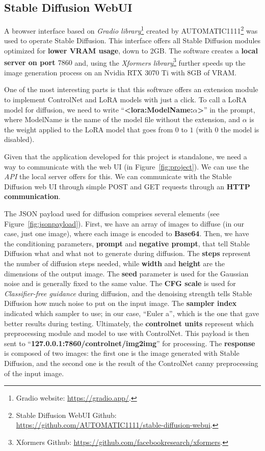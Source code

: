 \documentclass[sn-mathphys,Numbered]{sn-jnl}
\theoremstyle{thmstyleone}%
\theoremstyle{thmstyletwo}%
\theoremstyle{thmstylethree}%
\begin{document}
\subsection{Stable Diffusion WebUI} \label{sec:stable_diffusion_webui}

A browser interface based on \emph{Gradio library}\footnote{Gradio website: \url{https://gradio.app/}.} 
created by AUTOMATIC1111\footnote{Stable Diffusion WebUI Github: \url{https://github.com/AUTOMATIC1111/stable-diffusion-webui}.} 
was used to operate Stable Diffusion. 
This interface offers all Stable Diffusion modules optimized for \textbf{lower VRAM usage}, down to 2GB. 
The software creates a \textbf{local server on port $7860$} and,  using the \emph{Xformers library}\footnote{Xformers Github: \url{https://github.com/facebookresearch/xformers}.} further speeds up the image generation process on an Nvidia RTX 3070 Ti with 8GB of VRAM.

One of the most interesting parts is that this software offers an extension module to  implement ControlNet and LoRA models with just a click.  To call a LoRA model for diffusion, we need to write ``\textbf{<lora:ModelName:$\alpha$>}'' in the prompt,
where ModelName is the name of the model file without the extension,  and $\alpha$ is the weight applied to the LoRA model that goes from $0$ to $1$ (with $0$ the model is disabled). 

Given that the application developed for this project is standalone,  we need a way to communicate with the web UI (in Figure~\ref{fig:project}). We can use the \emph{API} the local server offers for this.
We can communicate with the Stable Diffusion web UI through simple 
POST and GET requests through an \textbf{HTTP communication}. 



The JSON payload used for diffusion comprises several elements (see Figure~\ref{fig:jsonpayload}).
First, we have an array of images to diffuse (in our case, just one image), 
where each image is encoded to \textbf{Base64}. 
Then, we have the conditioning parameters, \textbf{prompt} and \textbf{negative prompt}, 
that tell Stable Diffusion what and what not to generate during diffusion. 
The \textbf{steps} represent the number of diffusion steps needed, while \textbf{width} 
and \textbf{height} are the dimensions of the output image. 
The \textbf{seed} parameter is used for the Gaussian noise and is generally fixed to the same value. 
The \textbf{CFG scale} is used for \emph{Classifier-free guidance} during diffusion, 
and the denoising strength tells Stable Diffusion how much noise to put on the input image. 
The \textbf{sampler index} indicated which sampler to use; in our case, ``Euler a'', 
which is the one that gave better results during testing.
Ultimately, the \textbf{controlnet units} represent which preprocessing module and model to use with ControlNet.
This payload is then sent to ``\textbf{127.0.0.1:7860/controlnet/img2img}'' for processing. 
The \textbf{response} is composed of two images: the first one is the image generated with Stable Diffusion, 
and the second one is the result of the ControlNet canny preprocessing of the input image.
\end{document}

